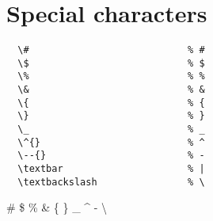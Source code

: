 
\chapter{Special characters}

\begin{lstlisting}
  \#                            % #
  \$                            % $
  \%                            % %
  \&                            % &
  \{                            % {
  \}                            % }
  \_                            % _
  \^{}                          % ^
  \--{}                         % -
  \textbar                      % |
  \textbackslash                % \
\end{lstlisting}


\#                            %
\$                            %
\%                            %
\&                            %
\{                            %
\}                            %
\_                            %
\^{}                          %
\--{}                         %
\textbar                      %
\textbackslash                %
